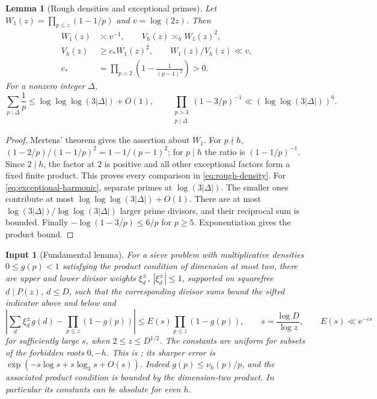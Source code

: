 \documentclass[11pt]{article}
\newtheorem{lemma}[theorem]{Lemma}
\newtheorem{inputthm}[theorem]{Input}
\theoremstyle{definition}
\newcommand{\e}{\mathrm e}
\theoremstyle{remark}
\numberwithin{equation}{section}
\begin{document}
\begin{lemma}[Rough densities and exceptional primes]\label{lem:density}
Let $W_1(z)=\prod_{p\le z}(1-1/p)$ and $v=\log(2z)$. Then
\begin{equation}\label{eq:rough-density}
\begin{aligned}
 W_1(z)&\asymp v^{-1},\qquad V_h(z)\asymp_h W_1(z)^2,\\
 V_h(z)&\ge c_*W_1(z)^2,\qquad W_1(z)/V_h(z)\ll v,\\
 c_*&=\prod_{p>2}\left(1-\frac1{(p-1)^2}\right)>0.
\end{aligned}
\end{equation}
For a nonzero integer $\Delta$,
\begin{equation}\label{eq:exceptional-harmonic}
 \sum_{p\mid\Delta}\frac1p\le\log\log\log(3|\Delta|)+O(1),\qquad
 \prod_{\substack{p>3\\p\mid\Delta}}(1-3/p)^{-1}
 \ll(\log\log(3|\Delta|))^6.
\end{equation}
\end{lemma}
\begin{proof}
Mertens' theorem \cite[Section~2.2]{MV} gives the assertion about $W_1$.
For $p\nmid h$, $(1-2/p)/(1-1/p)^2=1-1/(p-1)^2$; for $p\mid h$ the ratio is
$(1-1/p)^{-1}$. Since $2\mid h$, the factor at $2$ is positive and all other exceptional factors form a fixed
finite product. This proves every comparison in \eqref{eq:rough-density}.
For \eqref{eq:exceptional-harmonic}, separate primes at $\log(3|\Delta|)$. The smaller ones contribute at most
$\log\log\log(3|\Delta|)+O(1)$. There are at most
$\log(3|\Delta|)/\log\log(3|\Delta|)$ larger prime divisors, and their reciprocal sum is bounded.
Finally $-\log(1-3/p)\le6/p$ for $p\ge5$. Exponentiation gives the product bound.
\end{proof}

\begin{inputthm}[Fundamental lemma]\label{input:fl}
For a sieve problem with multiplicative densities $0\le g(p)<1$ satisfying the product condition of dimension
at most two, there are upper and lower divisor weights $\xi_d^\pm$, $|\xi_d^\pm|\le1$, supported on
squarefree $d\mid P(z)$, $d\le D$, such that the corresponding divisor sums bound the sifted indicator above
and below and
\begin{equation}\label{eq:fl}
 \left|\sum_d\xi_d^\pm g(d)-\prod_{p\le z}(1-g(p))\right|
 \le E(s)\prod_{p\le z}(1-g(p)),\qquad s=\frac{\log D}{\log z},\qquad E(s)\ll\e^{-cs}
\end{equation}
for sufficiently large $s$, when $2\le z\le D^{1/2}$.
The constants are uniform for subsets of the forbidden roots $0,-h$.
This is \cite[Theorem~3.6(a), p.~38; probability-space formulation, pp.~1--3]{Ford}; its sharper error is
$\exp(-s\log s+s\log_3s+O(s))$. Indeed $g(p)\le\nu_h(p)/p$, and the associated product condition is bounded by
the dimension-two product. In particular its constants can be absolute for even $h$.
\end{inputthm}
\end{document}
